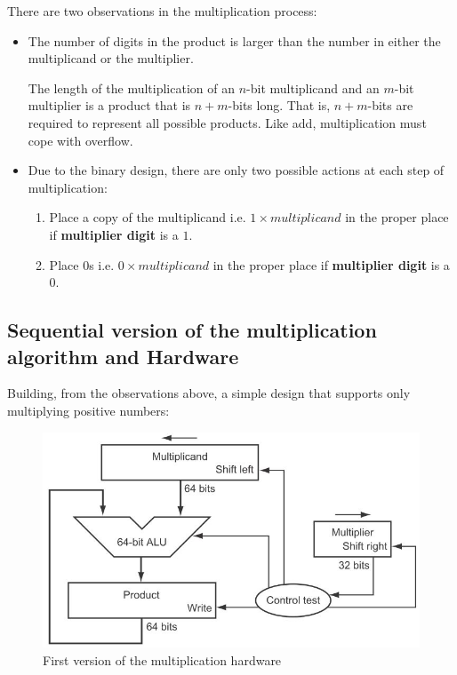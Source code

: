 \documentclass[10pt,a4paper]{article}
\begin{document}
There are two observations in the multiplication process:
\begin{itemize}
    \item The number of digits in the product is larger than the number in either the multiplicand
    or the multiplier. 
    
    The length of the multiplication of an $n$-bit multiplicand and an $m$-bit multiplier is a
    product that is $n+m$-bits long. That is, $n+m$-bits are required to represent all possible
    products.  Like add, multiplication must cope with overflow.
    \item Due to the binary design, there are only two possible actions at each step of multiplication:
    \begin{enumerate}
        \item Place a copy of the multiplicand i.e. $1 \times multiplicand$ in the proper place if
        \textbf{multiplier digit} is a $1$.
        \item Place $0$s i.e. $0 \times multiplicand$ in the proper place if \textbf{multiplier digit}
        is a $0$.
    \end{enumerate}
\end{itemize}

\pagebreak

\subsection{Sequential version of the multiplication algorithm and Hardware}

Building, from the observations above, a simple design that supports only multiplying positive
numbers: \par
\begin{figure} [h!]
    \centering
    \includegraphics[scale=0.55]{Multiply path.JPG}
    \caption{First version of the multiplication hardware}
\end{figure}
\end{document}
